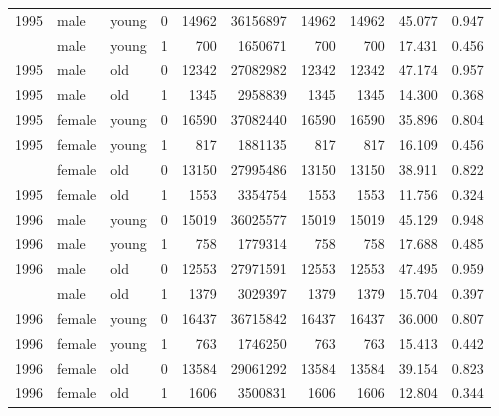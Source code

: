 \begin{table}
\begin{tabular}[t]{rllrrrrrrr}
1995 & male & young & 0 & 14962 & 36156897 & 14962 & 14962 & 45.077 & 0.947\\
\addlinespace
1995 & male & young & 1 & 700 & 1650671 & 700 & 700 & 17.431 & 0.456\\
1995 & male & old & 0 & 12342 & 27082982 & 12342 & 12342 & 47.174 & 0.957\\
1995 & male & old & 1 & 1345 & 2958839 & 1345 & 1345 & 14.300 & 0.368\\
1995 & female & young & 0 & 16590 & 37082440 & 16590 & 16590 & 35.896 & 0.804\\
1995 & female & young & 1 & 817 & 1881135 & 817 & 817 & 16.109 & 0.456\\
\addlinespace
1995 & female & old & 0 & 13150 & 27995486 & 13150 & 13150 & 38.911 & 0.822\\
1995 & female & old & 1 & 1553 & 3354754 & 1553 & 1553 & 11.756 & 0.324\\
1996 & male & young & 0 & 15019 & 36025577 & 15019 & 15019 & 45.129 & 0.948\\
1996 & male & young & 1 & 758 & 1779314 & 758 & 758 & 17.688 & 0.485\\
1996 & male & old & 0 & 12553 & 27971591 & 12553 & 12553 & 47.495 & 0.959\\
\addlinespace
1996 & male & old & 1 & 1379 & 3029397 & 1379 & 1379 & 15.704 & 0.397\\
1996 & female & young & 0 & 16437 & 36715842 & 16437 & 16437 & 36.000 & 0.807\\
1996 & female & young & 1 & 763 & 1746250 & 763 & 763 & 15.413 & 0.442\\
1996 & female & old & 0 & 13584 & 29061292 & 13584 & 13584 & 39.154 & 0.823\\
1996 & female & old & 1 & 1606 & 3500831 & 1606 & 1606 & 12.804 & 0.344\\
\bottomrule
\end{tabular}
\end{table}
